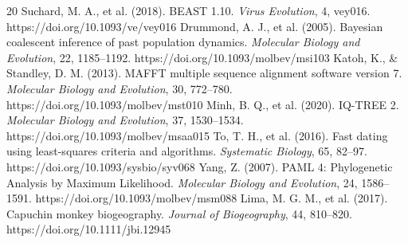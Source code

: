 \documentclass[10pt,letterpaper]{article}
\begin{document}
\begin{thebibliography}{20}
 Suchard, M. A., et al. (2018). BEAST 1.10. \emph{Virus Evolution}, 4, vey016. https://doi.org/10.1093/ve/vey016
 Drummond, A. J., et al. (2005). Bayesian coalescent inference of past population dynamics. \emph{Molecular Biology and Evolution}, 22, 1185--1192. https://doi.org/10.1093/molbev/msi103
 Katoh, K., \& Standley, D. M. (2013). MAFFT multiple sequence alignment software version 7. \emph{Molecular Biology and Evolution}, 30, 772--780. https://doi.org/10.1093/molbev/mst010
 Minh, B. Q., et al. (2020). IQ-TREE 2. \emph{Molecular Biology and Evolution}, 37, 1530--1534. https://doi.org/10.1093/molbev/msaa015
 To, T. H., et al. (2016). Fast dating using least-squares criteria and algorithms. \emph{Systematic Biology}, 65, 82--97. https://doi.org/10.1093/sysbio/syv068
 Yang, Z. (2007). PAML 4: Phylogenetic Analysis by Maximum Likelihood. \emph{Molecular Biology and Evolution}, 24, 1586--1591. https://doi.org/10.1093/molbev/msm088
 Lima, M. G. M., et al. (2017). Capuchin monkey biogeography. \emph{Journal of Biogeography}, 44, 810--820. https://doi.org/10.1111/jbi.12945
\end{thebibliography}
\end{document}
